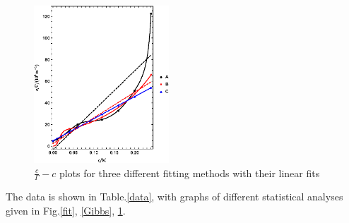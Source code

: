 \documentclass[%
 reprint,
 amsmath,amssymb,
 aps,
10.5pt,
]{revtex4-1}
\begin{document}
\begin{figure}
\centering
\includegraphics[width=0.45\textwidth]{figures/Langmuir.eps}
\caption{$\frac{c}{\Gamma}-c$ plots for three different fitting methods with their linear fits}
\label{Langmuir}
\end{figure}

The data is shown in Table.\ref{data}, with graphs of different statistical analyses given in Fig.\ref{fit}, \ref{Gibbs}, \ref{Langmuir}. 
\end{document}
